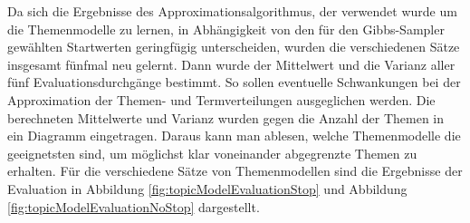 Da sich die Ergebnisse des Approximationsalgorithmus, der verwendet wurde um die Themenmodelle zu lernen, in Abhängigkeit von den für den Gibbs-Sampler gewählten Startwerten geringfügig unterscheiden, wurden die verschiedenen Sätze insgesamt fünfmal neu gelernt. Dann wurde der Mittelwert und die Varianz aller fünf Evaluationsdurchgänge bestimmt. So sollen eventuelle Schwankungen bei der Approximation der Themen- und Termverteilungen ausgeglichen werden. Die berechneten Mittelwerte und Varianz wurden gegen die Anzahl der Themen in ein Diagramm eingetragen. Daraus kann man ablesen, welche Themenmodelle die geeignetsten sind, um möglichst klar voneinander abgegrenzte Themen zu erhalten. Für die verschiedene Sätze von Themenmodellen sind die Ergebnisse der Evaluation in Abbildung \ref{fig:topicModelEvaluationStop} und Abbildung \ref{fig:topicModelEvaluationNoStop} dargestellt. 

